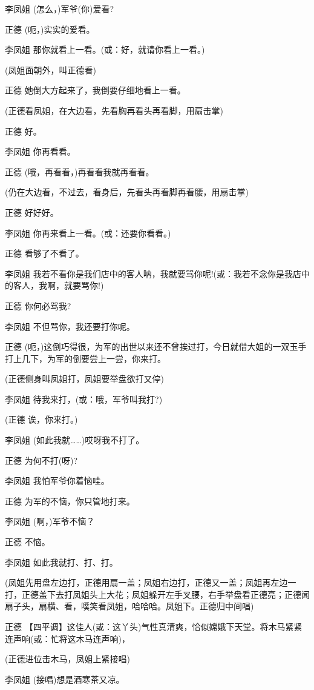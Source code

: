 李凤姐 (怎么，)军爷(你)爱看?

正德 (呃，)实实的爱看。

李凤姐 那你就看上一看。(或：好，就请你看上一看。)

(凤姐面朝外，叫正德看)

正德 她倒大方起来了，我倒要仔细地看上一看。

(正德看凤姐，在大边看，先看胸再看头再看脚，用扇击掌)

正德 好。

李凤姐 你再看看。

正德 (哦，再看看，)再看看我就再看看。

(仍在大边看，不过去，看身后，先看头再看脚再看腰，用扇击掌)

正德 好好好。

李凤姐 你再来看上一看。(或：还要你看看。)

正德 看够了不看了。

李凤姐
我若不看你是我们店中的客人呐，我就要骂你呢!(或：我若不念你是我店中的客人，我啊，就要骂你!)

正德 你何必骂我?

李凤姐 不但骂你，我还要打你呢。

正德
(呃，)这倒巧得很，为军的出世以来还不曾挨过打，今日就借大姐的一双玉手打上几下，为军的倒要尝上一尝，你来打。

(正德侧身叫凤姐打，凤姐要举盘欲打又停)

李凤姐 待我来打，(或：哦，军爷叫我打?)

(正德 诶，你来打。)

李凤姐 (如此我就\ldots{}\ldots{})哎呀我不打了。

正德 为何不打(呀)?

李凤姐 我怕军爷你着恼哇。

正德 为军的不恼，你只管地打来。

李凤姐 (啊，)军爷不恼？

正德 不恼。

李凤姐 如此我就打、打、打。

(凤姐先用盘左边打，正德用扇一盖；凤姐右边打，正德又一盖；凤姐再左边一打，正德盖下去打凤姐头上大花；凤姐躲开左手叉腰，右手举盘看正德亮；正德闻扇子头，扇横、看，噗笑看凤姐，哈哈哈。凤姐下。正德归中间唱)

正德
【四平调】这佳人(或：这丫头)气性真清爽，恰似嫦娥下天堂。将木马紧紧连声响(或：忙将这木马连声响)，

(正德进位击木马，凤姐上紧接唱)

李凤姐 (接唱)想是酒寒茶又凉。

